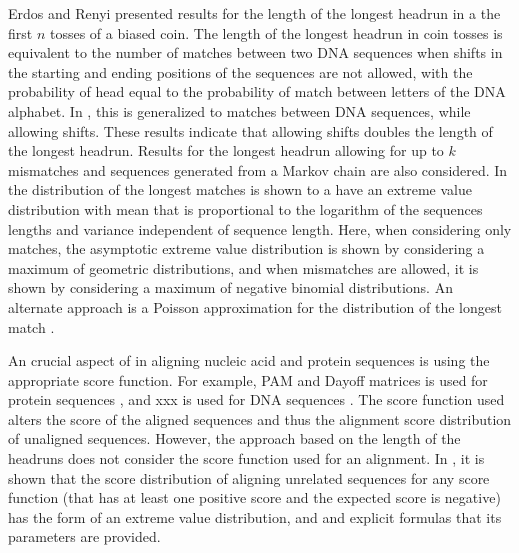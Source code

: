 Erdos and Renyi \cite{erdos1975length} presented results for the length
of the longest headrun in a the first $n$ tosses of a biased coin.  The
length of the longest headrun in coin tosses is equivalent to the number
of matches between two DNA sequences when shifts in the starting and
ending positions of the sequences are not allowed, with the probability
of head equal to the probability of match between letters of the DNA
alphabet.
In \cite{arratia1985erdos}, this is generalized to matches between DNA
sequences, while allowing shifts. These results indicate that allowing
shifts doubles the length of the longest headrun. Results for the
longest headrun allowing for up to $k$ mismatches and sequences
generated from a Markov chain are also considered.
In \cite{arratia1986extreme,gordon1986extreme} the distribution of the
longest matches is shown to a have an extreme value distribution with
mean that is proportional to the logarithm of the sequences lengths and
variance independent of sequence length. Here, when considering only
matches, the asymptotic extreme value distribution is shown by
considering a maximum of geometric distributions, and when mismatches
are allowed, it is shown by considering a maximum of negative binomial
distributions.
An alternate approach is a Poisson approximation for the distribution of
the longest match \cite{arratia1989erdos}.

An crucial aspect of in aligning nucleic acid and protein sequences is
using the appropriate score function. For example, PAM and Dayoff
matrices is used for protein sequences \cite{}, and xxx is used for DNA
sequences \cite{}.  The score function used alters the score of the
aligned sequences and thus the alignment score distribution of unaligned
sequences.
However, the approach based on the length of the headruns does not
consider the score function used for an alignment.
%
In \cite{}, it is shown that the score distribution of aligning
unrelated sequences for any score function (that has at least one
positive score and the expected score is negative) has the form of an
extreme value distribution, and and explicit formulas that its parameters
are provided.





